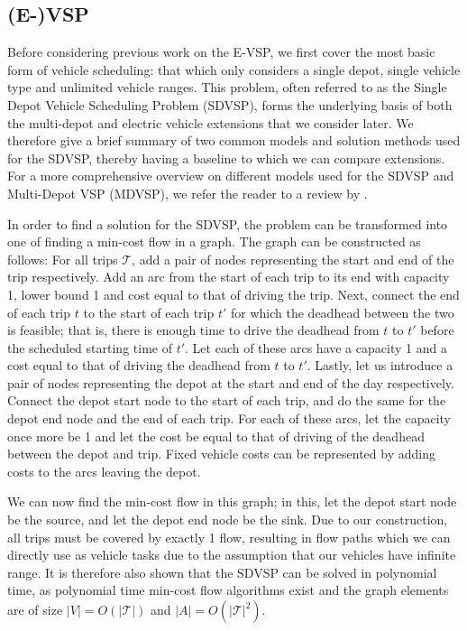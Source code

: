 \documentclass[]{article}
\begin{document}
\subsection{(E-)VSP}
Before considering previous work on the E-VSP, we first cover the most basic form of vehicle scheduling: that which only considers a single depot, single vehicle type and unlimited vehicle ranges. This problem, often referred to as the Single Depot Vehicle Scheduling Problem (SDVSP), forms the underlying basis of both the multi-depot and electric vehicle extensions that we consider later. We therefore give a brief summary of two common models and solution methods used for the SDVSP, thereby having a baseline to which we can compare extensions. For a more comprehensive overview on different models used for the SDVSP and Multi-Depot VSP (MDVSP), we refer the reader to a review by \citet{Bunte2009}.

In order to find a solution for the SDVSP, the problem can be transformed into one of finding a min-cost flow in a graph. The graph can be constructed as follows: For all trips $\mathcal{T}$, add a pair of nodes representing the start and end of the trip respectively. Add an arc from the start of each trip to its end with capacity 1, lower bound 1 and cost equal to that of driving the trip. Next, connect the end of each trip $t$ to the start of each trip $t'$ for which the deadhead between the two is feasible; that is, there is enough time to drive the deadhead from $t$ to $t'$ before the scheduled starting time of $t'$. Let each of these arcs have a capacity 1 and a cost equal to that of driving the deadhead from $t$ to $t'$. Lastly, let us introduce a pair of nodes representing the depot at the start and end of the day respectively. Connect the depot start node to the start of each trip, and do the same for the depot end node and the end of each trip. For each of these arcs, let the capacity once more be 1 and let the cost be equal to that of driving of the deadhead between the depot and trip. Fixed vehicle costs can be represented by adding costs to the arcs leaving the depot.

We can now find the min-cost flow in this graph; in this, let the depot start node be the source, and let the depot end node be the sink. Due to our construction, all trips must be covered by exactly 1 flow, resulting in flow paths which we can directly use as vehicle tasks due to the assumption that our vehicles have infinite range. It is therefore also shown that the SDVSP can be solved in polynomial time, as polynomial time min-cost flow algorithms exist and the graph elements are of size $|V| = O(|\mathcal{T}|)$ and $|A| = O(|\mathcal{T}|^2)$.
\end{document}
